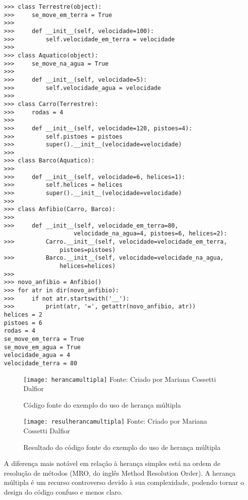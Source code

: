 \begin{lstlisting}
>>> class Terrestre(object):
>>> 	se_move_em_terra = True
>>>
>>> 	def __init__(self, velocidade=100):
>>> 		self.velocidade_em_terra = velocidade
>>> 
>>> class Aquatico(object):
>>> 	se_move_na_agua = True
>>>
>>> 	def __init__(self, velocidade=5):
>>> 		self.velocidade_agua = velocidade
>>>
>>> class Carro(Terrestre):
>>> 	rodas = 4
>>>
>>> 	def __init__(self, velocidade=120, pistoes=4):
>>> 		self.pistoes = pistoes
>>> 		super().__init__(velocidade=velocidade)
>>>
>>> class Barco(Aquatico):
>>>
>>> 	def __init__(self, velocidade=6, helices=1):
>>> 		self.helices = helices
>>> 		super().__init__(velocidade=velocidade)
>>> 
>>> class Anfibio(Carro, Barco):
>>> 
>>>     def __init__(self, velocidade_em_terra=80, 
                    velocidade_na_agua=4, pistoes=6, helices=2):
>>> 		Carro.__init__(self, velocidade=velocidade_em_terra, 
				pistoes=pistoes)
>>> 		Barco.__init__(self, velocidade=velocidade_na_agua, 
				helices=helices)
>>>
>>> novo_anfibio = Anfibio()
>>> for atr in dir(novo_anfibio):
>>> 	if not atr.startswith('__'):
>>> 		print(atr, '=', getattr(novo_anfibio, atr))
helices = 2
pistoes = 6
rodas = 4
se_move_em_terra = True
se_move_em_agua = True
velocidade_agua = 4
velocidade_terra = 80
\end{lstlisting}

\begin{figure}[H]
	\begin{center}
		\caption{C\'{o}digo fonte do exemplo do uso de heran\c{c}a m\'{u}ltipla} \label{fonteherancamultipla}
		\texttt{[image: herancamultipla]} 
		\newline
		Fonte: Criado por Mariana Cossetti Dalfior
	\end{center}
\end{figure}

\begin{figure}[H]
	\begin{center}
		\caption{Resultado do c\'{o}digo fonte do exemplo do uso de heran\c{c}a m\'{u}ltipla} \label{resulherancamultipla}
		\texttt{[image: resulherancamultipla]} 
		\newline
		Fonte: Criado por Mariana Cossetti Dalfior
	\end{center}
\end{figure}

A diferen\c{c}a mais not\'{a}vel em rela\c{c}\~{a}o \`{a} heran\c{c}a simples est\'{a} na ordem de resolu\c{c}\~{a}o de m\'{e}todos (MRO, do ingl\^{e}s Method Resolution Order). A heran\c{c}a m\'{u}ltipla \'{e} um recurso controverso devido \`{a} sua complexidade, podendo tornar o design do c\'{o}digo confuso e menos claro.

